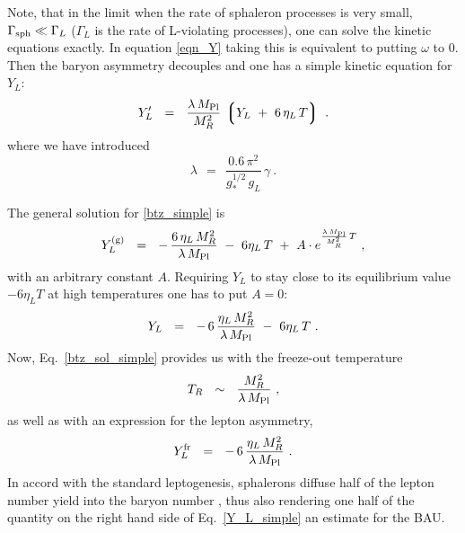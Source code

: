 \documentclass[12pt]{revtex4}
\newcommand{\lgr}{\left\lgroup}
\newcommand{\rgr}{\right\rgroup}
\newcommand{\Mpl}{M_{\rm Pl}}
\newcommand{\Gsph}{\Gamma_{\rm sph}}
\begin{document}
	Note, that in the limit when the rate of sphaleron processes
	is very small, $ \Gsph \ll \Gamma_L $ ($ \Gamma_L $ is the rate
	of L-violating processes), one can solve the kinetic equations
	exactly. 
	In equation \eqref{eqn_Y} taking this is equivalent to 
	putting $ \omega $ to $ 0 $.
	Then the baryon asymmetry decouples and one has a simple 
	kinetic equation for $ Y_L $:
\begin{equation}
\label{btz_simple}
	Y_L' ~~=~~ \frac{\lambda\,\Mpl}{M_R^2} \,
			\lgr Y_L ~+~ 6\,\eta_L\, T \rgr~.
\end{equation}
	where we have introduced
\[
	\lambda ~~=~~ \frac{0.6\, \pi^2}
    		         {g_*^{1/2}\, g_L}\,\gamma~.
\]
	
	The general solution for \eqref{btz_simple} is
\[
	Y_L^{(\rm g)} ~~=~~ -\,\frac{6\,\eta_L\,M_R^2}{\lambda\,\Mpl}
		~-~ 6\eta_L\,T ~+~
		A\cdot e^{\frac{\lambda\, \Mpl}{M_R^2}\, T}~,
\]
	with an arbitrary constant $ A $.
	Requiring $ Y_L $ to stay close to its equilibrium value 
	$ - 6\eta_L T $ at high temperatures one has to 
	put $ A = 0 $:
\begin{equation}
\label{btz_sol_simple}
	Y_L ~~=~~ -\,6\,\frac{\eta_L\,M_R^2}{\lambda\,\Mpl}
		~-~ 6\eta_L\,T ~.
\end{equation}
	Now, Eq.~\eqref{btz_sol_simple} provides us with the freeze-out
	temperature
\begin{equation}
\label{T_R}
	T_R ~~\sim~~ \frac{M_R^2}{\lambda\,\Mpl}~,
\end{equation}
	as well as with an expression for the lepton asymmetry,
\begin{equation}
\label{Y_L_simple}
	Y_L^{\rm fr} ~~=~~ -\, 6\,\frac{\eta_L\,M_R^2}{\lambda\,\Mpl}~.
\end{equation}
	In accord with the standard leptogenesis, sphalerons diffuse
	half of the lepton number yield into the baryon number
\cite{Kuzmin:1985mm}, 
	thus also rendering one half of the quantity on the right hand side
	of Eq.~\eqref{Y_L_simple} an estimate for the BAU.
	
\end{document}
